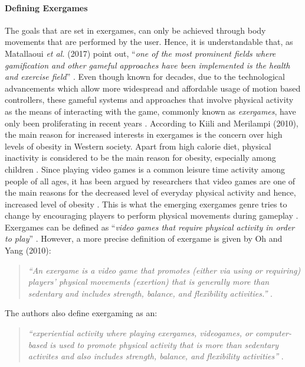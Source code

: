 \paragraph{Defining Exergames}
The goals that are set in exergames, can only be achieved through body movements that are performed by the user. Hence, it is understandable that, as Matallaoui \textit{et al.} (2017) point out, ``\textit{one of the most prominent fields where
gamification and other gameful approaches have been
implemented is the health and exercise field}'' \cite{matallaoui2017effective}. Even though known for decades, due to the technological advancements which allow more widespread and affordable usage of motion based controllers, these gameful systems and approaches that involve physical activity as the means of interacting with the game, commonly known as \textit{exergames}, have only been proliferating 
in recent years \cite{matallaoui2017effective}. 
According to Kiili and Merilampi (2010), the main reason for increased interests in exergames is the concern over high levels of obesity in Western society. Apart from high calorie diet, physical inactivity is considered to be the main reason for obesity, especially among children \cite{kiili2010developing}. Since playing video games is a common leisure time activity among people of all ages, it has been argued by researchers \cite{kiili2010developing} that video games are one of the main reasons for the decreased level of everyday physical activity and hence, increased level of obesity \cite{vandewater2004linking}. This is what the emerging exergames genre tries to change by encouraging players to perform physical movements during gameplay \cite{kiili2010developing}. Exergames can be defined as ``\textit{video games that require physical activity in order to play}'' \cite{oh2010defining}. However, a more precise definition of exergame is given by Oh and Yang (2010):
\begin{quotation}
\textit{``An exergame is a video
game that promotes (either via using or requiring) players’ physical movements (exertion) that is
generally more than sedentary and includes strength, balance, and flexibility activities.''} \cite{oh2010defining}.
\end{quotation}
The authors also define exergaming as an: 
\begin{quotation}
\textit{``experiential activity where playing exergames, videogames, or computer-based is used to promote physical activity that is more than sedentary activites and also includes strength, balance,
and flexibility activities''} \cite{oh2010defining}.
\end{quotation}
